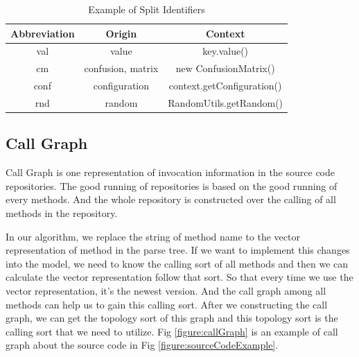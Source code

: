 \begin{table}[!htp]
\centering
\caption{Example of Split Identifiers}
\label{table:abbr}
\begin{tabular}{|c|c|c|}
\hline
Abbreviation & Origin & Context\\
\hline
val & value & key.value()\\
\hline
cm & confusion, matrix & new ConfusionMatrix()\\
\hline
conf & configuration & context.getConfiguration()\\
\hline
rnd & random & RandomUtils.getRandom()\\
\hline
\end{tabular}

\end{table}

\subsection{Call Graph}



Call Graph is one representation of invocation information in the source code repositories. The good running of repositories is based on the good running of every methods. And the whole repository is constructed over the calling of all methods in the repository.

In our algorithm, we replace the string of method name to the vector representation of method in the parse tree. If we want to implement this changes into the model, we need to know the calling sort of all methods and then we can calculate the vector representation follow that sort. So that every time we use the vector representation, it's the newest version.
And the call graph among all methods can help us to gain this calling sort. After we constructing the call graph, we can get the topology sort of this graph and this topology sort is the calling sort that we need to utilize. Fig \ref{figure:callGraph} is an example of call graph about the source code in Fig \ref{figure:sourceCodeExample}.

